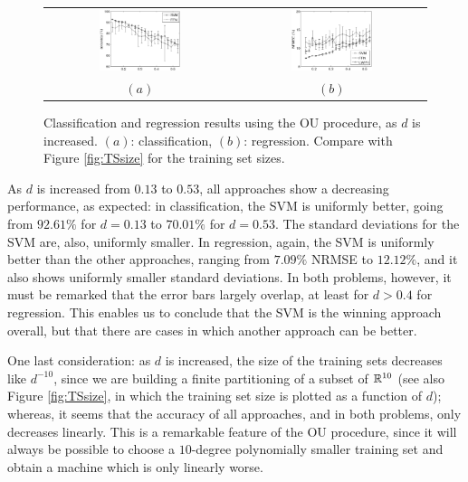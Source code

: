 \begin{figure}[!ht] \centering
  \begin{tabular}{cc}
    \includegraphics[width=0.45\textwidth]{figs/fig_all1.eps} &
    \includegraphics[width=0.45\textwidth]{figs/fig_all2.eps} \\
    $(a)$ & $(b)$ \\
  \end{tabular}
  \caption{Classification and regression results using the OU
  procedure, as $d$ is increased. $(a)$: classification, $(b)$:
    regression. Compare with Figure \ref{fig:TSsize} for the training
    set sizes.}
  \label{fig:allres}
\end{figure}

As $d$ is increased from $0.13$ to $0.53$, all approaches show a
decreasing performance, as expected: in classification, the SVM is
uniformly better, going from $92.61\%$ for $d=0.13$ to $70.01\%$ for
$d=0.53$. The standard deviations for the SVM are, also, uniformly
smaller. In regression, again, the SVM is uniformly better than the
other approaches, ranging from $7.09\%$ NRMSE to $12.12\%$, and it
also shows uniformly smaller standard deviations. In both problems,
however, it must be remarked that the error bars largely overlap, at
least for $d>0.4$ for regression. This enables us to conclude that the
SVM is the winning approach overall, but that there are cases in which
another approach can be better.

One last consideration: as $d$ is increased, the size of the training
sets decreases like $d^{-10}$, since we are building a finite
partitioning of a subset of $\mathbb{R}^{10}$ (see also Figure
\ref{fig:TSsize}, in which the training set size is plotted as a
function of $d$); whereas, it seems that the accuracy of all
approaches, and in both problems, only decreases linearly. This is a
remarkable feature of the OU procedure, since it will always be
possible to choose a $10$-degree polynomially smaller training set and
obtain a machine which is only linearly worse.

